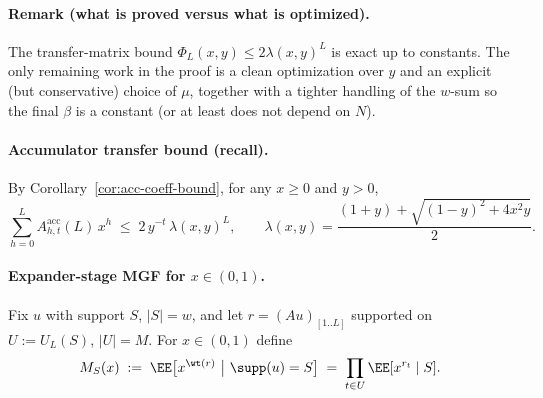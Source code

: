 \paragraph{Remark (what is proved versus what is optimized).}
The transfer-matrix bound $\Phi_L(x,y)\le 2\lambda(x,y)^L$ is exact up to constants.
The only remaining work in the proof is a clean optimization over $y$ and an explicit (but conservative) choice of $\mu$,
together with a tighter handling of the $w$-sum so the final $\beta$ is a constant (or at least does not depend on $N$).

%
%

\paragraph{Accumulator transfer bound (recall).}
By Corollary~\ref{cor:acc-coeff-bound}, for any $x\ge 0$ and $y>0$,
\[
\sum_{h=0}^{L} A^{\mathrm{acc}}_{h,t}(L)\,x^{h}
\;\le\;
2\,y^{-t}\,\lambda(x,y)^{L},
\qquad
\lambda(x,y)=\frac{(1+y)+\sqrt{(1-y)^2+4x^2y}}{2}.
\]

\paragraph{Expander-stage MGF for $x\in(0,1)$.}
Fix $u$ with support $S$, $|S|=w$, and let $r=(Au)_{[1..L]}$ supported on $U:=U_L(S)$, $|U|=M$.
For $x\in(0,1)$ define
\[
M_S(x)\;:=\;\EE\big[x^{\wt(r)}\ \big|\ \supp(u)=S\big]
\;=\;\prod_{t\in U}\EE[x^{r_t}\mid S].
\]


